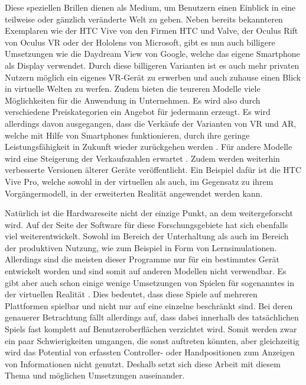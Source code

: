 	Diese speziellen Brillen dienen als Medium, um Benutzern einen Einblick in eine teilweise oder gänzlich veränderte Welt zu geben.
	Neben bereits bekannteren Exemplaren wie der HTC Vive von den Firmen HTC und Valve, der Oculus Rift von Oculus VR oder der Hololens von Microsoft, gibt es nun auch billigere Umsetzungen wie die Daydream View von Google, welche das eigene Smartphone als Display verwendet.
	Durch diese billigeren Varianten ist es auch mehr privaten Nutzern möglich ein eigenes VR-Gerät zu erwerben und auch zuhause einen Blick in virtuelle Welten zu werfen. Zudem bieten die teureren Modelle viele Möglichkeiten für die Anwendung in Unternehmen. Es wird also durch verschiedene Preiskategorien ein Angebot für jedermann erzeugt.
	Es wird allerdings davon ausgegangen, dass die Verkäufe der Varianten von VR und AR, welche mit Hilfe von Smartphones funktionieren, durch ihre geringe Leistungsfähigkeit in Zukunft wieder zurückgehen werden \cite{verkauf2}. Für andere Modelle wird eine Steigerung der Verkaufszahlen erwartet \cite{verkaufVR}\cite{verkauf2}.
	Zudem werden weiterhin verbesserte Versionen älterer Geräte veröffentlicht. Ein Beispiel dafür ist die HTC Vive Pro, welche sowohl in der virtuellen als auch, im Gegensatz zu ihrem Vorgängermodell, in der erweiterten Realität angewendet werden kann.

	Natürlich ist die Hardwareseite nicht der einzige Punkt, an dem weitergeforscht wird. Auf der Seite der Software für diese Forschungsgebiete hat sich ebenfalls viel weiterentwickelt. Sowohl im Bereich der Unterhaltung als auch im Bereich der produktiven Nutzung, wie zum Beispiel in Form von Lernsimulationen. Allerdings sind die meisten dieser Programme nur für ein bestimmtes Gerät entwickelt worden und sind somit auf anderen Modellen nicht verwendbar. Es gibt aber auch schon einige wenige Umsetzungen von Spielen für sogenanntes  in der virtuellen Realität \cite{crossCB}. Dies bedeutet, dass diese Spiele auf mehreren Plattformen spielbar und nicht nur auf eine einzelne beschränkt sind. Bei deren genauerer Betrachtung fällt allerdings auf, dass dabei innerhalb des tatsächlichen Spiels fast komplett auf Benutzeroberflächen verzichtet wird. Somit werden zwar ein paar Schwierigkeiten umgangen, die sonst auftreten könnten, aber gleichzeitig wird das Potential von erfassten Controller- oder Handpositionen zum Anzeigen von Informationen nicht genutzt. Deshalb setzt sich diese Arbeit mit diesem Thema und möglichen Umsetzungen auseinander.
	
